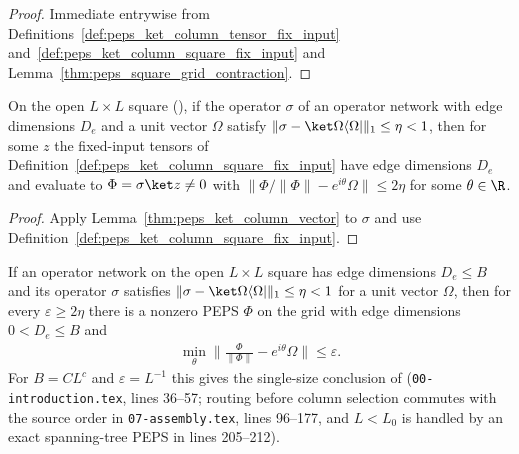 \begin{proof}\leanok
    Immediate entrywise from Definitions~\ref{def:peps_ket_column_tensor_fix_input} and~\ref{def:peps_ket_column_square_fix_input} and Lemma~\ref{thm:peps_square_grid_contraction}.
\end{proof}

\begin{lemma}
    \label{thm:peps_ket_column_square}
    \leanok
    On the open $L\times L$ square (\cite[Lemma~8.1]{OpenAI2026PolynomialPEPS}),
    if the operator $\sigma$ of an operator network with edge dimensions $D_e$ and a unit vector $\Omega$ satisfy
    $\lVert\sigma-\ket\Omega\langle\Omega|\rVert_1\le\eta<1$, then for some
    $z$ the fixed-input tensors of Definition~\ref{def:peps_ket_column_square_fix_input} have edge dimensions $D_e$ and evaluate to $\Phi=\sigma\ket z\ne0$ with $\lVert\Phi/\lVert\Phi\rVert-e^{i\theta}\Omega\rVert\le2\eta$ for some $\theta\in\R$.
\end{lemma}

\begin{proof}\leanok
    Apply Lemma~\ref{thm:peps_ket_column_vector} to $\sigma$ and use Definition~\ref{def:peps_ket_column_square_fix_input}.
\end{proof}

\begin{corollary}
    \label{cor:peps_ket_column_square_main}
    \leanok
    If an operator network on the open $L\times L$ square has edge dimensions $D_e\le B$ and its operator $\sigma$ satisfies $\lVert\sigma-\ket\Omega\langle\Omega|\rVert_1\le\eta<1$ for a unit vector $\Omega$, then for every $\varepsilon\ge2\eta$ there is a nonzero PEPS $\Phi$ on the grid with edge dimensions $0<D_e\le B$ and
    \begin{align}
        \min_{\theta}\Big\lVert\frac{\Phi}{\lVert\Phi\rVert}
        -e^{i\theta}\Omega\Big\rVert\le\varepsilon .
    \end{align}
    For $B=CL^c$ and $\varepsilon=L^{-1}$ this gives the single-size conclusion of \cite[Theorem~1.1]{OpenAI2026PolynomialPEPS} (\texttt{00-introduction.tex}, lines 36--57; routing before column selection commutes with the source order in \texttt{07-assembly.tex}, lines 96--177, and $L<L_0$ is handled by an exact spanning-tree PEPS in lines 205--212).
\end{corollary}

